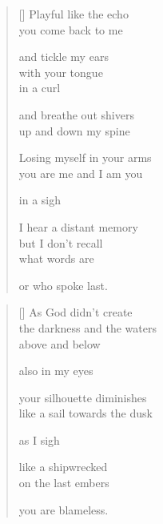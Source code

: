 \documentclass[14pt]{extbook}
\newcommand*{\centeredornament}{\centerline{\pgfornament[width=6cm]{88}}}
\begin{document}
\newpage

\vspace*{-15mm}
\centeredornament
\vspace*{-7mm}


\settowidth{\versewidth}{Losing myself in your arms}

\begin{verse}[\versewidth]
  Playful like the echo \\
  you come back to me

  and tickle my ears \\
  with your tongue \\
  in a curl

  and breathe out shivers \\
  up and down my spine

  Losing myself in your arms \\
  you are me and I am you

  in a sigh

  I hear a distant memory \\
  but I don't recall \\
  what words are

  or who spoke last.
\end{verse}


\newpage

\vspace*{-15mm}
\centeredornament
\vspace*{-7mm}


\settowidth{\versewidth}{the darkness and the waters}

\begin{verse}[\versewidth]
  As God didn't create \\
  the darkness and the waters \\
  above and below

  also in my eyes

  your silhouette diminishes \\
  like a sail towards the dusk

  as I sigh

  like a shipwrecked \\
  on the last embers

  you are blameless.
\end{verse}
\end{document}
